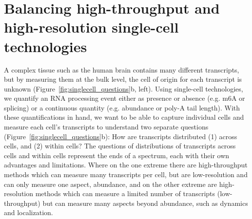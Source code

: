 

\section{Balancing high-throughput and high-resolution single-cell technologies}

A complex tissue such as the human brain contains many different transcripts, but by measuring them at the bulk level, the cell of origin for each transcript is unknown (Figure~\ref{fig:singlecell_questions}b, left). Using single-cell technologies, we quantify an RNA processing event either as presence or absence (e.g. m6A or splicing) or a continuous quantity (e.g. abundance or poly-A tail length). With these quantifications in hand, we want to be able to capture individual cells and measure each cell's transcripts to understand two separate questions (Figure~\ref{fig:singlecell_questions}b): How are transcripts distributed (1) across cells, and (2) within cells?
	The questions of distributions of transcripts across cells and within cells represent the ends of a spectrum, each with their own advantages and limitations. Where on the one extreme there are high-throughput methods which can measure many transcripts per cell, but are low-resolution and can only measure one aspect, abundance, and on the other extreme are high-resolution methods which can measure a limited number of transcripts (low-throughput) but can measure many aspects beyond abundance, such as dynamics and localization.
	

